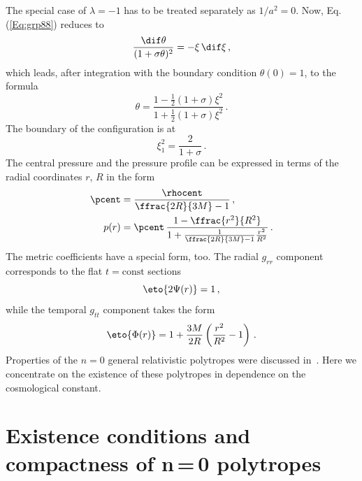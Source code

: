 The special case of $\lambda = -1$ has to be treated separately as
$1/a^{2}=0$. Now, Eq.\,(\ref{Eq:grp88}) reduces to
\begin{equation}
  \frac{\dif\theta}{(1+\sigma\theta)^{2}}
    = -\xi\,\dif\xi\,,                                    \label{Eq:grp100}
\end{equation}
which leads, after integration with the boundary condition $\theta(0)=1$, to
the formula
\begin{equation}
  \theta = \frac%
    {1-\frac{1}{2}(1+\sigma)\xi^{2}}%
    {1+\frac{1}{2}(1+\sigma)\xi^{2}}\,.                   \label{Eq:grp101}
\end{equation}
The boundary of the configuration is at
\begin{equation}
  \xi_{1}^{2} = \frac{2}{1+\sigma}\,.                     \label{Eq:grp102}
\end{equation}
The central pressure and the pressure profile can be expressed in terms of the
radial coordinates $r$, $R$ in the form
\begin{align}
  \pcent &=
    \frac{\rhocent}{\ffrac{2R}{3M}-1}\,,                  \label{Eq:grp103}\\
  p(r) &=
     \pcent\,\frac{1-\ffrac{r^{2}}{R^{2}}}%
     {1+\frac{1}{\ffrac{2R}{3M}-1}\frac{r^{2}}{R^{2}}}\,.  \label{Eq:grp104}
\end{align}
The metric coefficients have a special form, too. The radial $g_{rr}$
component corresponds to the flat $t = \mathrm{const}$ sections
\begin{equation}
  \eto{2\Psi(r)} = 1\,,                                   \label{Eq:grp105}
\end{equation}
while the temporal $g_{tt}$ component takes the form~\cite{Stu:2000:ACTPS2:}
\begin{equation}
  \eto{\Phi(r)} = 1
    + \frac{3M}{2R}\left(\frac{r^{2}}{R^{2}}-1\right)\,.  \label{Eq:grp107}
\end{equation}
Properties of the $n=0$ general relativistic polytropes were discussed
in~\cite{Stu:2000:ACTPS2:,%
  Stu-etal:2001:PHYSR4:}. Here we concentrate on the
existence of these polytropes in dependence on the cosmological constant.

\section[Existence conditions of the $n=0$ polytropes]%
{Existence conditions and compactness of \mbox{n\,=\,0}
  polytropes}\label{Sec:UniCond}

